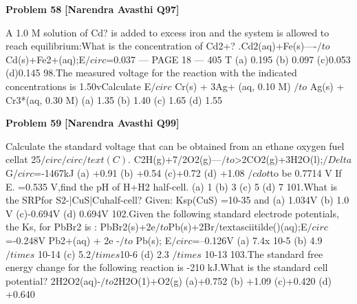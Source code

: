 \begin{problembox}
\textbf{Problem 58} \hfill \textbf{[Narendra Avasthi Q97]}
\label{q:ext-narendra_avasthi_all_questions-58}

A 1.0 M solution of Cd? is added to excess iron and the system is allowed to reach
equilibrium:What is the concentration of Cd2+?
.Cd$2$(aq)+Fe(s)----$/to$Cd(s)+Fe2+(aq);E$/circ$=0.037
--- PAGE 18 ---
405
T
(a) 0.195
(b) 0.097
(c)0.053
(d)0.145
98.The measured voltage for the reaction with the indicated concentrations is 1.50vCalculate E$/circ$
Cr(s) + 3Ag+ (aq, 0.10 M) $/to$ Ag(s) + Cr3*(aq, 0.30 M)
(a) 1.35
(b) 1.40
(c) 1.65
(d) 1.55
\end{problembox}

\begin{problembox}
\textbf{Problem 59} \hfill \textbf{[Narendra Avasthi Q99]}
\label{q:ext-narendra_avasthi_all_questions-59}

Calculate the standard voltage that can be obtained from an ethane oxygen fuel cellat 25$/circ$$/circ/text(C)$.
C2H(g)+7/2O2(g)---$/to$>2CO2(g)+3H2O(l);$/Delta$G$/circ$=-1467kJ
(a) +0.91
(b) +0.54
(c)+0.72
(d) +1.08
$/cdot$to be 0.7714 V If E.
\underline{\hspace{1cm}}=0.535 V,find the pH of H+H2 half-cell.
(a) 1
(b) 3
(c) 5
(d) 7
101.What is the SRPfor S$2$-|CuS|Cuhalf-cell?
Given:
Ksp(CuS) =10-35 and
(a) 1.034V
(b) 1.0 V
(c)-0.694V
(d) 0.694V
102.Given the following standard electrode potentials, the Ks, for PbBr2 is :
PbBr2(s)+2e$/to$Pb(s)+2Br/textasciitilde()(aq);E$/circ$=-0.248V
Pb2+(aq) + 2e -$/to$ Pb(s);
E$/circ$=--0.126V
(a) 7.4x 10-5
(b) 4.9 $/times$ 10-14
(c) 5.2$/times$10-6
(d) 2.3 $/times$ 10-13
103.The standard free energy change for the following reaction is -210 kJ.What is the standard
cell potential?
2H2O2(aq)-$/to$2H2O(1)+O2(g)
(a)+0.752
(b) +1.09
(c)+0.420
(d) +0.640
\end{problembox}


